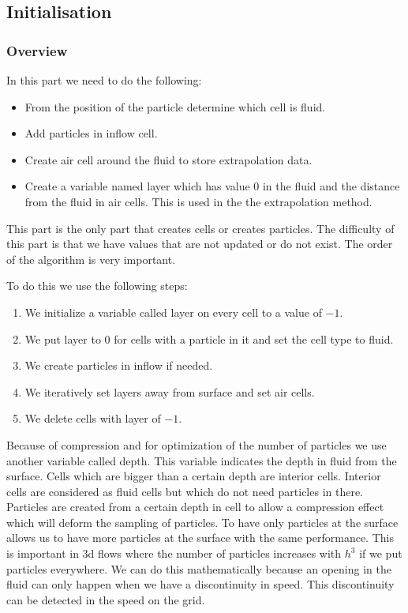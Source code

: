 \subsection{Initialisation}

\subsubsection{Overview}
In this part we need to do the following:
\begin{itemize}
 \item From the position of the particle determine which cell is fluid.
 \item Add particles in inflow cell.
 \item Create air cell around the fluid to store extrapolation data.
 \item Create a variable named layer which has value $0$ in the fluid and the distance from the fluid in air cells.
 This is used in the the extrapolation method.
\end{itemize}
This part is the only part that creates cells or creates particles.
The difficulty of this part is that we have values that are not updated or do not exist.
The order of the algorithm is very important.

To do this we use the following steps:
\begin{enumerate}
 \item We initialize a variable called layer on every cell to a value of $-1$.
 \item We put layer to $0$ for cells with a particle in it and set the cell type to fluid.
 \item We create particles in inflow if needed.
 \item We iteratively set layers away from surface and set air cells.
 \item We delete cells with layer of $-1$.
\end{enumerate}

Because of compression and for optimization of the number of particles we use another variable called depth.
This variable indicates the depth in fluid from the surface.
Cells which are bigger than a certain depth are interior cells.
Interior cells are considered as fluid cells but which do not need particles in there.
Particles are created from  a certain depth in cell to allow a compression effect which will deform the sampling of particles.
To have only particles at the surface allows us to have more particles at the surface with the same performance. This is important in 3d flows
where the number of particles increases with $h^3$ if we put particles everywhere.
We can do this mathematically because an opening in the fluid can only happen when we have a discontinuity in speed.
This discontinuity can be detected in the speed on the grid.

